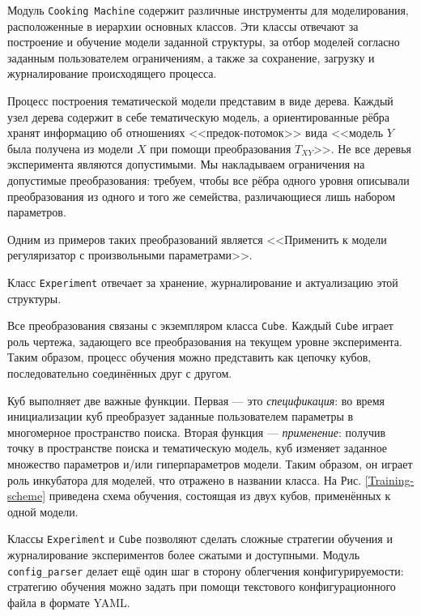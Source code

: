 Модуль \texttt{Cooking Machine} содержит различные инструменты для моделирования, расположенные в иерархии основных классов. Эти классы отвечают за построение и обучение модели заданной структуры, за отбор моделей согласно заданным пользователем ограничениям, а также за сохранение, загрузку и журналирование происходящего процесса.

Процесс построения тематической модели представим в виде дерева. Каждый узел дерева содержит в себе тематическую модель, а ориентированные рёбра хранят информацию об отношениях <<предок-потомок>> вида <<модель $Y$ была получена из модели $X$ при помощи преобразования $T_{XY}$>>. Не все деревья эксперимента являются допустимыми. Мы накладываем ограничения на допустимые преобразования: требуем, чтобы все рёбра одного уровня описывали преобразования из одного и того же семейства, различающиеся лишь набором параметров. 

Одним из примеров таких преобразований является <<Применить к модели регуляризатор с произвольными параметрами>>. 

Класс \texttt{Experiment} отвечает за хранение, журналирование и актуализацию этой структуры.  

Все преобразования связаны с экземпляром класса \texttt{Cube}. Каждый \texttt{Cube} играет роль чертежа, задающего все преобразования на текущем уровне эксперимента. Таким образом, процесс обучения можно представить как цепочку кубов, последовательно соединённых друг с другом.  

Куб выполняет две важные функции. Первая --- это \textit{спецификация}: во время инициализации куб преобразует заданные пользователем параметры в многомерное пространство поиска. Вторая функция --- \textit{применение}: получив точку в пространстве поиска и тематическую модель, куб изменяет заданное множество параметров и/или гиперпараметров модели. Таким образом, он играет роль инкубатора для моделей, что отражено в названии класса. На Рис.  \ref{Training-scheme} приведена схема обучения, состоящая из двух кубов, применённых к одной модели.  

Классы \texttt{Experiment} и \texttt{Cube} позволяют сделать сложные стратегии обучения и журналирование экспериментов более сжатыми и доступными. Модуль \texttt{config\_parser} делает ещё один шаг в сторону облегчения конфигурируемости: стратегию обучения можно задать при помощи текстового конфигурационного файла в формате YAML.  

